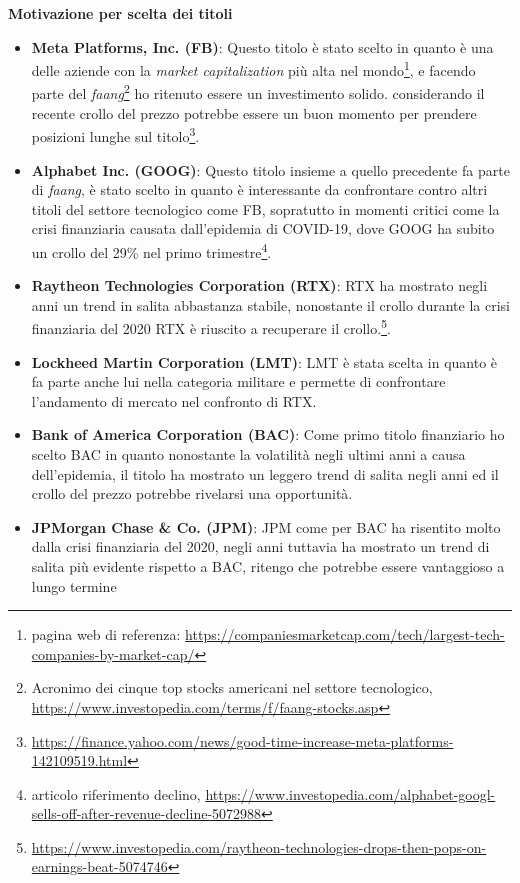 \documentclass{article}
\begin{document}
\textbf{Motivazione per scelta dei titoli}

\begin{itemize}
  \item \textbf{Meta Platforms, Inc. (FB)}: Questo titolo è stato scelto in quanto è  una delle aziende con la \emph{market capitalization} più alta nel mondo\footnote{pagina web di referenza: \href{https://companiesmarketcap.com/tech/largest-tech-companies-by-market-cap/}{https://companiesmarketcap.com/tech/largest-tech-companies-by-market-cap/}},
  e facendo parte del \emph{faang}\footnote{Acronimo dei cinque top stocks americani nel settore tecnologico, \href{https://www.investopedia.com/terms/f/faang-stocks.asp}{https://www.investopedia.com/terms/f/faang-stocks.asp}} ho ritenuto essere un investimento solido.
  considerando il recente crollo del prezzo potrebbe essere un buon momento per prendere posizioni lunghe sul titolo\footnote{\href{https://finance.yahoo.com/news/good-time-increase-meta-platforms-142109519.html}{https://finance.yahoo.com/news/good-time-increase-meta-platforms-142109519.html}}.

  \item \textbf{Alphabet Inc. (GOOG)}: Questo titolo insieme a quello precedente fa parte di \emph{faang}\footnotemark[2], è stato scelto in quanto è interessante da confrontare contro altri titoli del settore tecnologico come FB, sopratutto in momenti critici come la crisi finanziaria causata
  dall'epidemia di COVID-19, dove GOOG ha subito un crollo del 29\% nel primo trimestre\footnote{articolo riferimento declino, \href{https://www.investopedia.com/alphabet-googl-sells-off-after-revenue-decline-5072988}{https://www.investopedia.com/alphabet-googl-sells-off-after-revenue-decline-5072988}}.
  
  \item \textbf{Raytheon Technologies Corporation (RTX)}: RTX ha mostrato negli anni un trend in salita abbastanza stabile, nonostante il crollo durante la crisi finanziaria del 2020 RTX è riuscito a recuperare il crollo.\footnote{\href{https://www.investopedia.com/raytheon-technologies-drops-then-pops-on-earnings-beat-5074746}{https://www.investopedia.com/raytheon-technologies-drops-then-pops-on-earnings-beat-5074746}}.
  
  \item \textbf{Lockheed Martin Corporation (LMT)}: LMT è stata scelta in quanto è fa parte anche lui nella categoria militare e permette di confrontare l'andamento di mercato nel confronto di RTX.
  
  \item \textbf{Bank of America Corporation (BAC)}: Come primo titolo finanziario ho scelto BAC in quanto nonostante la volatilità negli ultimi anni a causa dell'epidemia, il titolo ha mostrato un leggero trend di salita negli anni ed il crollo del prezzo potrebbe
  rivelarsi una opportunità.
  
  \item \textbf{JPMorgan Chase \& Co. (JPM)}: JPM come per BAC ha risentito molto dalla crisi finanziaria del 2020, negli anni tuttavia ha mostrato un trend di salita più evidente rispetto a BAC, ritengo che potrebbe essere vantaggioso a lungo termine
\end{itemize}
\end{document}
